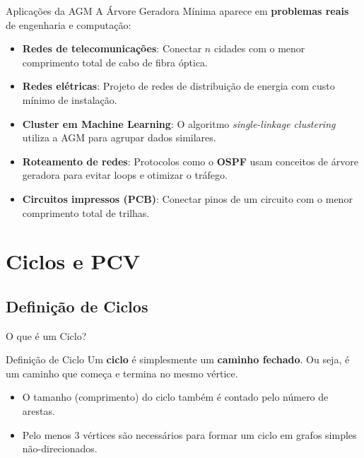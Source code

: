 \documentclass[9pt]{beamer}
\begin{document}
\begin{frame}{Aplicações da AGM}
    A Árvore Geradora Mínima aparece em \textbf{problemas reais} de engenharia e computação:
    \vspace{0.3cm}
    \begin{itemize}
        \item \textbf{Redes de telecomunicações}: Conectar $n$ cidades com o menor comprimento total de cabo de fibra óptica.
        \vspace{0.2cm}
        \item \textbf{Redes elétricas}: Projeto de redes de distribuição de energia com custo mínimo de instalação.
        \vspace{0.2cm}
        \item \textbf{Cluster em Machine Learning}: O algoritmo \textit{single-linkage clustering} utiliza a AGM para agrupar dados similares.
        \vspace{0.2cm}
        \item \textbf{Roteamento de redes}: Protocolos como o \textbf{OSPF} usam conceitos de árvore geradora para evitar loops e otimizar o tráfego.
        \vspace{0.2cm}
        \item \textbf{Circuitos impressos (PCB)}: Conectar pinos de um circuito com o menor comprimento total de trilhas.
    \end{itemize}
\end{frame}


\section{Ciclos e PCV}
\subsection{Definição de Ciclos}
\begin{frame}{O que é um Ciclo?}
    \begin{block}{Definição de Ciclo}
        Um \textbf{ciclo} é simplesmente um \textbf{caminho fechado}. Ou seja, é um caminho que começa e termina no mesmo vértice.
    \end{block}
    \vspace{0.5cm}
    \begin{itemize}
        \item O tamanho (comprimento) do ciclo também é contado pelo número de arestas.
        \item Pelo menos 3 vértices são necessários para formar um ciclo em grafos simples não-direcionados.
    \end{itemize}
\end{frame}
\end{document}
